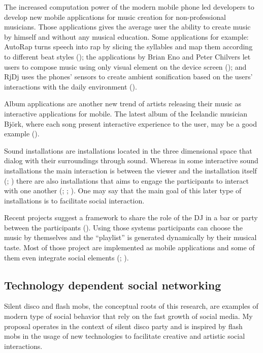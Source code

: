\documentclass[a4paper,11pt]{article}
\begin{document}
The increased computation power of the modern mobile phone led developers to develop new mobile applications for music creation for non-professional musicians.
Those applications gives the average user the ability to create music by himself and without any musical education.
Some applications for example: AutoRap turns speech into rap by slicing the syllables and map them according to different beat styles (\citeauthor{web:autorap}); the applications by Brian Eno and Peter Chilvers let users to compose music using only visual element on the device screen (\citeauthor{web:generativemusic}); and RjDj uses the phones' sensors to create ambient sonification based on the users' interactions with the daily environment (\cite{web:rjdj})\label{rjdj}.

Album applications are another new trend of artists releasing their music as interactive applications for mobile.
The latest album of the Icelandic musician Bj\"{o}rk, where each song present interactive experience to the user, may be a good example (\cite{stimulant13}).

Sound installations are installations located in the three dimensional space that dialog with their surroundings through sound.
Whereas in some interactive sound installations the main interaction is between the viewer and the installation itself (\cite{web:visnjic}; \cite{web:cardiff01}) there are also installations that aims to engage the participants to interact with one another (\cite{eng03}; \cite{web:kirn12}; \cite{web:murray-browne13}).
One may say that the main goal of this later type of installations is to facilitate social interaction.

Recent projects suggest a framework to share the role of the DJ in a bar or party between the participants (\cite{web:shaw}).
Using those systems participants can choose the music by themselves and the ``playlist'' is generated dynamically by their musical taste.
Most of those project are implemented as mobile applications and some of them even integrate social elements (\citeauthor{web:playmysong}; \cite{web:lammers}).

\subsection{Technology dependent social networking}

Silent disco and flash mobs, the conceptual roots of this research, are examples of modern type of social behavior that rely on the fast growth of social media.
My proposal operates in the context of silent disco party and is inspired by flash mobs in the usage of new technologies to facilitate creative and artistic social interactions.
\end{document}
